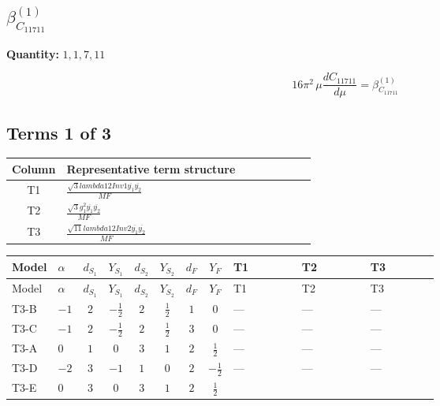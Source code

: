 \documentclass[8pt]{article}
\begin{document}
\begin{landscape}
\section*{$\beta_{C_{11711}}^{(1)}$}
\noindent\textbf{Quantity: }$\mathrm{1,1,7,11}$\par\smallskip
\[16\pi^2\,\mu\frac{d C_{11711}}{d\mu}=\beta_{C_{11711}}^{(1)}\]
\subsection*{Terms 1 of 3}
\begin{center}
\begin{tabular}{@{}c >{\raggedright\arraybackslash}p{0.82\linewidth}@{}}
\toprule
Column & Representative term structure \\
\midrule
T1 & \(\displaystyle \frac{\sqrt{3} lambda12Inv1 \overline{y_{1}} \overline{y_{2}}}{MF}\) \\
\midrule
T2 & \(\displaystyle \frac{\sqrt{3} g_{1}^{2} \overline{y_{1}} \overline{y_{2}}}{MF}\) \\
\midrule
T3 & \(\displaystyle \frac{\sqrt{11} lambda12Inv2 \overline{y_{1}} \overline{y_{2}}}{MF}\) \\
\midrule
\bottomrule
\end{tabular}
\end{center}
\smallskip
\tiny
\begin{longtable}{@{}llcccccc >{\raggedright\arraybackslash}p{0.21\linewidth} >{\raggedright\arraybackslash}p{0.21\linewidth} >{\raggedright\arraybackslash}p{0.21\linewidth}@{}}
\toprule
Model & $\alpha$ & $d_{S_1}$ & $Y_{S_1}$ & $d_{S_2}$ & $Y_{S_2}$ & $d_F$ & $Y_F$ & T1 & T2 & T3 \\
\midrule
\endfirsthead
\toprule
Model & $\alpha$ & $d_{S_1}$ & $Y_{S_1}$ & $d_{S_2}$ & $Y_{S_2}$ & $d_F$ & $Y_F$ & T1 & T2 & T3 \\
\midrule
\endhead
T3-B & $-1$ & $2$ & $-\frac{1}{2}$ & $2$ & $\frac{1}{2}$ & $1$ & $0$ & --- & --- & --- \\
\midrule
T3-C & $-1$ & $2$ & $-\frac{1}{2}$ & $2$ & $\frac{1}{2}$ & $3$ & $0$ & --- & --- & --- \\
\midrule
T3-A & $0$ & $1$ & $0$ & $3$ & $1$ & $2$ & $\frac{1}{2}$ & --- & --- & --- \\
\midrule
T3-D & $-2$ & $3$ & $-1$ & $1$ & $0$ & $2$ & $-\frac{1}{2}$ & --- & --- & --- \\
\midrule
T3-E & $0$ & $3$ & $0$ & $3$ & $1$ & $2$ & $\frac{1}{2}$ & \scriptsize\adjustbox{max width=\linewidth}{$\begin{gathered} - \frac{\sqrt{3} lambda12Inv1 \overline{y_{1}} \overline{y_{2}}}{6 MF}\end{gathered}$} & \scriptsize\adjustbox{max width=\linewidth}{$\begin{gathered} \frac{\sqrt{3} g_{1}^{2} \overline{y_{1}} \overline{y_{2}}}{8 MF}\end{gathered}$} & \scriptsize\adjustbox{max width=\linewidth}{$\begin{gathered} \frac{3 \sqrt{11} lambda12Inv2 \overline{y_{1}} \overline{y_{2}}}{22 MF}\end{gathered}$} \\

\end{longtable}
\end{landscape}
\end{document}
